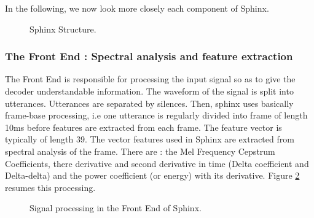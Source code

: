 In the following, we now look more closely each component of Sphinx. 

\begin{figure}[h!]
\caption{Sphinx Structure. \cite{understand_sphinx}}
\label{fig:sphinx_struc}
\end{figure}

\subsubsection*{The Front End : Spectral analysis and feature extraction}
The Front End is responsible for processing the input signal so as to give the decoder understandable information. The waveform of the signal is split into utterances. Utterances are separated by silences. Then, sphinx uses basically frame-base processing, i.e one utterance is regularly divided into frame of length 10ms before features are extracted from each frame. The feature vector is typically of length 39. The vector features used in Sphinx are extracted from spectral analysis of the frame. There are : the Mel Frequency Cepstrum Coefficients, there derivative and second derivative in time (Delta coefficient and Delta-delta) and the power coefficient (or energy) with its derivative. Figure \ref{fig:sig_proc_sphx} resumes this processing. 

\begin{figure}[h!]
\caption{Signal processing in the Front End of Sphinx. \cite{eff_algo}}
\label{fig:sig_proc_sphx}
\end{figure}

